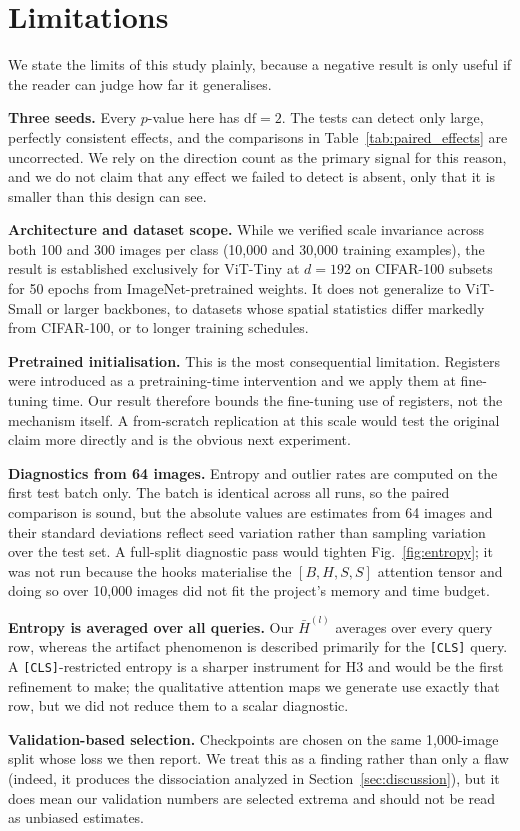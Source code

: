 \section{Limitations}
\label{sec:limitations}

We state the limits of this study plainly, because a negative result is only
useful if the reader can judge how far it generalises.

\textbf{Three seeds.} Every $p$-value here has $\mathrm{df} = 2$. The tests can
detect only large, perfectly consistent effects, and the comparisons in
Table~\ref{tab:paired_effects} are uncorrected. We rely on the direction count
as the primary signal for this reason, and we do not claim that any effect we
failed to detect is absent, only that it is smaller than this design can see.

\textbf{Architecture and dataset scope.} While we verified scale invariance across both 100 and 300 images per class (10{,}000 and 30{,}000 training examples), the result is established exclusively for ViT-Tiny at $d = 192$ on CIFAR-100 subsets for 50 epochs from ImageNet-pretrained weights. It does not generalize to ViT-Small or larger backbones, to datasets whose spatial statistics differ markedly from CIFAR-100, or to longer training schedules.

\textbf{Pretrained initialisation.} This is the most consequential limitation.
Registers were introduced as a pretraining-time intervention and we apply them
at fine-tuning time. Our result therefore bounds the fine-tuning use of
registers, not the mechanism itself. A from-scratch replication at this scale
would test the original claim more directly and is the obvious next experiment.

\textbf{Diagnostics from 64 images.} Entropy and outlier rates are computed on
the first test batch only. The batch is identical across all runs, so the
paired comparison is sound, but the absolute values are estimates from 64
images and their standard deviations reflect seed variation rather than sampling
variation over the test set. A full-split diagnostic pass would tighten
Fig.~\ref{fig:entropy}; it was not run because the hooks materialise the
$[B,H,S,S]$ attention tensor and doing so over 10{,}000 images did not fit the
project's memory and time budget.

\textbf{Entropy is averaged over all queries.} Our $\bar{H}^{(l)}$ averages over
every query row, whereas the artifact phenomenon is described primarily for the
\texttt{[CLS]} query. A \texttt{[CLS]}-restricted entropy is a sharper
instrument for H3 and would be the first refinement to make; the qualitative
attention maps we generate use exactly that row, but we did not reduce them to
a scalar diagnostic.

\textbf{Validation-based selection.} Checkpoints are chosen on the same
1{,}000-image split whose loss we then report. We treat this as a finding rather
than only a flaw (indeed, it produces the dissociation analyzed in
Section~\ref{sec:discussion}), but it does mean our validation numbers are
selected extrema and should not be read as unbiased estimates.

